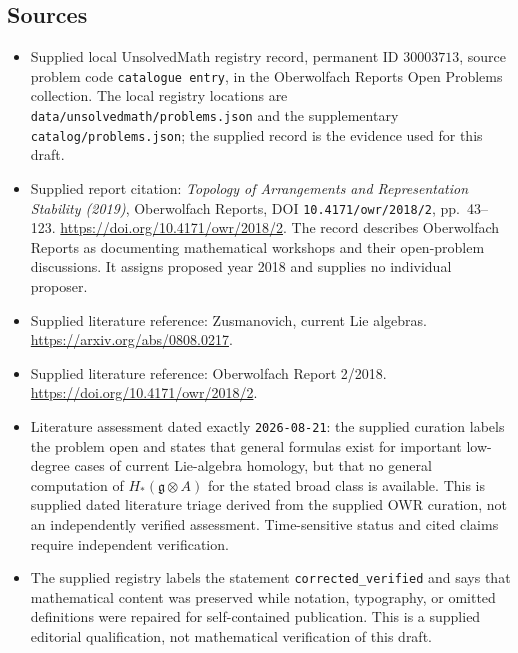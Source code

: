 \documentclass[11pt]{article}
\begin{document}
\subsection{Sources}
\begin{itemize}
\item Supplied local UnsolvedMath registry record, permanent ID \(30003713\), source problem code \texttt{catalogue entry}, in the Oberwolfach Reports Open Problems collection. The local registry locations are \texttt{data/unsolvedmath/problems.json} and the supplementary \texttt{catalog/problems.json}; the supplied record is the evidence used for this draft.
\item Supplied report citation: \emph{Topology of Arrangements and Representation Stability (2019)}, Oberwolfach Reports, DOI \texttt{10.4171/owr/2018/2}, pp.~43--123. \url{https://doi.org/10.4171/owr/2018/2}. The record describes Oberwolfach Reports as documenting mathematical workshops and their open-problem discussions. It assigns proposed year 2018 and supplies no individual proposer.
\item Supplied literature reference: Zusmanovich, current Lie algebras. \url{https://arxiv.org/abs/0808.0217}.
\item Supplied literature reference: Oberwolfach Report 2/2018. \url{https://doi.org/10.4171/owr/2018/2}.
\item Literature assessment dated exactly \texttt{2026-08-21}: the supplied curation labels the problem open and states that general formulas exist for important low-degree cases of current Lie-algebra homology, but that no general computation of \(H_*(\mathfrak g\otimes A)\) for the stated broad class is available. This is supplied dated literature triage derived from the supplied OWR curation, not an independently verified assessment. Time-sensitive status and cited claims require independent verification.
\item The supplied registry labels the statement \texttt{corrected\_verified} and says that mathematical content was preserved while notation, typography, or omitted definitions were repaired for self-contained publication. This is a supplied editorial qualification, not mathematical verification of this draft.
\end{itemize}
\end{document}
